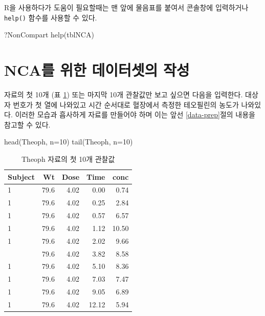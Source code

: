 \documentclass[
  11pt,
  krantz2, a4paper, twoside]{krantz}
\newenvironment{Shaded}{\begin{snugshade}}{\end{snugshade}}
\newcommand{\AttributeTok}[1]{\textcolor[rgb]{0.77,0.63,0.00}{#1}}
\newcommand{\DecValTok}[1]{\textcolor[rgb]{0.00,0.00,0.81}{#1}}
\newcommand{\FunctionTok}[1]{\textcolor[rgb]{0.00,0.00,0.00}{#1}}
\newcommand{\NormalTok}[1]{#1}
\theoremstyle{definition}
\theoremstyle{definition}
\theoremstyle{definition}
\theoremstyle{definition}
\theoremstyle{remark}
\begin{document}
R을 사용하다가 도움이 필요할때는 맨 앞에 물음표를 붙여서 콘솔창에 입력하거나 \texttt{help()} 함수를 사용할 수 있다.

\begin{Shaded}
\begin{Highlighting}[]
\NormalTok{?NonCompart}
\FunctionTok{help}\NormalTok{(tblNCA)}
\end{Highlighting}
\end{Shaded}

\hypertarget{ncauxb97c-uxc704uxd55c-uxb370uxc774uxd130uxc14buxc758-uxc791uxc131}{%
\section{NCA를 위한 데이터셋의 작성}\label{ncauxb97c-uxc704uxd55c-uxb370uxc774uxd130uxc14buxc758-uxc791uxc131}}

자료의 첫 10개 (표 \ref{tab:head}) 또는 마지막 10개 관찰값만 보고 싶으면 다음을 입력한다.
대상자 번호가 첫 열에 나와있고 시간 순서대로 혈장에서 측정한 테오필린의 농도가 나와있다.
이러한 모습과 흡사하게 자료를 만들어야 하며 이는 앞선 \ref{data-prep}절의 내용을 참고할 수 있다.

\begin{Shaded}
\begin{Highlighting}[]
\FunctionTok{head}\NormalTok{(Theoph, }\AttributeTok{n=}\DecValTok{10}\NormalTok{)}
\FunctionTok{tail}\NormalTok{(Theoph, }\AttributeTok{n=}\DecValTok{10}\NormalTok{)}
\end{Highlighting}
\end{Shaded}

\begin{table}

\caption{\label{tab:head}Theoph 자료의 첫 10개 관찰값}
\centering
\begin{tabular}[t]{lrrrr}
\toprule
Subject & Wt & Dose & Time & conc\\
\midrule
1 & 79.6 & 4.02 & 0.00 & 0.74\\
1 & 79.6 & 4.02 & 0.25 & 2.84\\
1 & 79.6 & 4.02 & 0.57 & 6.57\\
1 & 79.6 & 4.02 & 1.12 & 10.50\\
1 & 79.6 & 4.02 & 2.02 & 9.66\\
\addlinespace
1 & 79.6 & 4.02 & 3.82 & 8.58\\
1 & 79.6 & 4.02 & 5.10 & 8.36\\
1 & 79.6 & 4.02 & 7.03 & 7.47\\
1 & 79.6 & 4.02 & 9.05 & 6.89\\
1 & 79.6 & 4.02 & 12.12 & 5.94\\
\bottomrule
\end{tabular}
\end{table}
\end{document}
